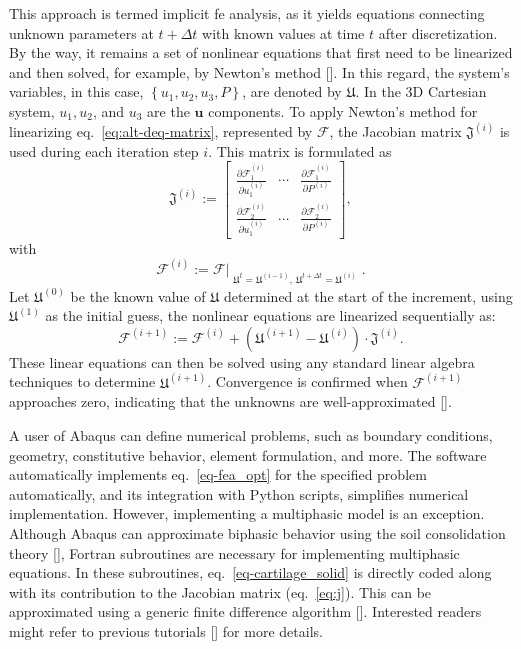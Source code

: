\documentclass[12pt,a4paper]{report}
\begin{document}
This approach is termed implicit \ac{fe} analysis, as it yields equations connecting unknown parameters at $t + \Delta t$ with known values at time $t$ after discretization. By the way, it remains a set of nonlinear equations that first need to be linearized and then solved, for example, by Newton's method [\cite{almeida1997,belytschko2014}]. In this regard, the system's variables, in this case, $\left\{ u_1, u_2, u_3, P \right\}$, are denoted by $\mathfrak{U}$. In the 3D Cartesian system, $u_1, u_2$, and $u_3$ are the $\mathbf{u}$ components. To apply Newton's method for linearizing eq.~\ref{eq:alt-deq-matrix}, represented by $\mathcal{F}$, the Jacobian matrix $\mathfrak{J}^{(i)}$ is used during each iteration step $i$. This matrix is formulated as
%
\begin{equation}
    \label{eq:j}
    \mathfrak{J}^{(i)} := \begin{bmatrix}
        \frac{\partial \mathcal{F}^{(i)}_1}{\partial u^{(i)}_1} & \cdots & \frac{\partial \mathcal{F}^{(i)}_1}{\partial P^{(i)}}\\
        \frac{\partial \mathcal{F}^{(i)}_2}{\partial u^{(i)}_1} & \cdots & \frac{\partial \mathcal{F}^{(i)}_2}{\partial P^{(i)}}
    \end{bmatrix},
\end{equation}
%
with
%
\begin{equation}
    \mathcal{F}^{(i)} := \mathcal{F}\Big|_{\substack{\mathfrak{U}^t=\mathfrak{U}^{(i-1)}, \: \mathfrak{U}^{t+\Delta t}=\mathfrak{U}^{(i)}}}.
\end{equation}
%
Let $\mathfrak{U}^{(0)}$ be the known value of $\mathfrak{U}$ determined at the start of the increment, using $\mathfrak{U}^{(1)}$ as the initial guess, the nonlinear equations are linearized sequentially as:
%
\begin{equation}\label{eq-fea_opt}
    \mathcal{F}^{(i+1)} := \mathcal{F}^{(i)} + \left ( \mathfrak{U}^{(i+1)} - \mathfrak{U}^{(i)} \right ) \cdot \mathfrak{J}^{(i)}.
\end{equation}
%
These linear equations can then be solved using any standard linear algebra techniques to determine $\mathfrak{U}^{(i+1)}$. Convergence is confirmed when $\mathcal{F}^{(i+1)}$ approaches zero, indicating that the unknowns are well-approximated [\cite{belytschko2014}].

A user of Abaqus can define numerical problems, such as boundary conditions, geometry, constitutive behavior, element formulation, and more. The software automatically implements eq.~\ref{eq-fea_opt} for the specified problem automatically, and its integration with Python scripts, simplifies numerical implementation. However, implementing a multiphasic model is an exception. Although Abaqus can approximate biphasic behavior using the soil consolidation theory [\cite{verruijt1984}], Fortran subroutines are necessary for implementing multiphasic equations. In these subroutines, eq.~\ref{eq-cartilage_solid} is directly coded along with its contribution to the Jacobian matrix (eq.~\ref{eq:j}). This can be approximated using a generic finite difference algorithm [\cite{miehe1996}]. Interested readers might refer to previous tutorials [\cite{nolan2022,fehervary2020}] for more details.
\end{document}
